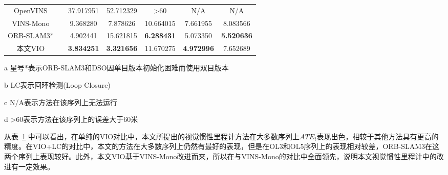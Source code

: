 \begin{table}
\begin{threeparttable}
\begin{tabular}{c|c|ccccc}
OpenVINS        &                         & 37.917951                                & 52.712329                                & {\textgreater{}60}                               & N/A                                      & N/A                                      \\
VINS-Mono       &                         & 9.368280                                 & 7.878626                                 & 10.664015                                & 7.661955                                 & 8.083566                                 \\
ORB-SLAM3*       &                         & 4.902441                                 & 15.621815                                & \cellcolor[HTML]{FA7F6F}\textbf{6.288431}                                 & 5.073350                                 & \cellcolor[HTML]{FA7F6F}\textbf{5.520636}                                 \\
本文VIO            &                         & \cellcolor[HTML]{FA7F6F}\textbf{3.834251}                                 & \cellcolor[HTML]{FA7F6F}\textbf{3.321656}                                 & 11.670275                                & \cellcolor[HTML]{FA7F6F}\textbf{4.972996}                                 & 7.652689                                 \\ \bottomrule
\end{tabular}
\label{tab:vio_ate}
\begin{tablenotes}
  \item [a] 星号*表示ORB-SLAM3和DSO因单目版本初始化困难而使用双目版本
  \item [b] LC表示回环检测(Loop Closure)
  \item [c] N/A表示方法在该序列上无法运行
  \item [d] \textgreater{}60表示方法在该序列上的误差大于60米
\end{tablenotes}
\end{threeparttable}
\end{table}

从表~\ref{tab:vio_ate} 中可以看出，在单纯的VIO对比中，本文所提出的视觉惯性里程计方法在大多数序列上$ATE_t$表现出色，相较于其他方法具有更高的精度。在VIO+LC的对比中，本文的方法在大多数序列上仍然有最好的表现，但是在OL3和OL5序列上的表现相对较差，ORB-SLAM3在这两个序列上表现较好。此外，本文VIO基于VINS-Mono改进而来，所以在与VINS-Mono的对比中全面领先，说明本文视觉惯性里程计中的改进有一定效果。

